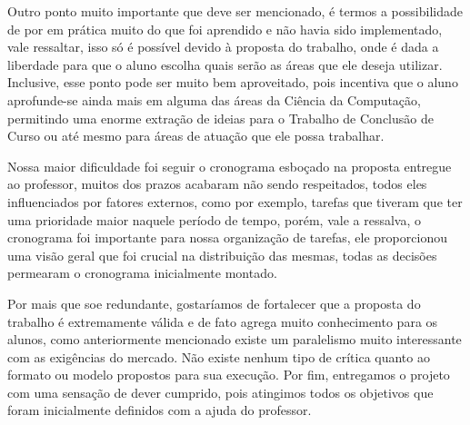 Outro ponto muito importante que deve ser mencionado, é termos a possibilidade de por em prática muito do que foi aprendido e não havia sido implementado, vale ressaltar, isso só é possível devido à proposta do trabalho, onde é dada a liberdade para que o aluno escolha quais serão as áreas que ele deseja utilizar. Inclusive, esse ponto pode ser muito bem aproveitado, pois incentiva que o aluno aprofunde-se ainda mais em alguma das áreas da Ciência da Computação, permitindo uma enorme extração de ideias para o Trabalho de Conclusão de Curso ou até mesmo para áreas de atuação que ele possa trabalhar.

Nossa maior dificuldade foi seguir o cronograma esboçado na proposta entregue ao professor, muitos dos prazos acabaram não sendo respeitados, todos eles influenciados por fatores externos, como por exemplo, tarefas que tiveram que ter uma prioridade maior naquele período de tempo, porém, vale a ressalva, o cronograma foi importante para nossa organização de tarefas, ele proporcionou uma visão geral que foi crucial na distribuição das mesmas, todas as decisões permearam o cronograma inicialmente montado.

Por mais que soe redundante, gostaríamos de fortalecer que a proposta do trabalho é extremamente válida e de fato agrega muito conhecimento para os alunos, como anteriormente mencionado existe um paralelismo muito interessante com as exigências do mercado. Não existe nenhum tipo de crítica quanto ao formato ou modelo propostos para sua execução. Por fim, entregamos o projeto com uma sensação de dever cumprido, pois atingimos todos os objetivos que foram inicialmente definidos com a ajuda do professor.